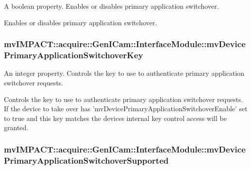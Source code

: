 A boolean property. Enables or disables primary application switchover. 

Enables or disables primary application switchover. \hypertarget{classmv_i_m_p_a_c_t_1_1acquire_1_1_gen_i_cam_1_1_interface_module_a3f91c3df402ffff61dcf0f896d2cc4cf}{
\subsubsection[{mv\+Device\+Primary\+Application\+Switchover\+Key}]{ mv\+I\+M\+P\+A\+C\+T\+::acquire\+::\+Gen\+I\+Cam\+::\+Interface\+Module\+::mv\+Device\+Primary\+Application\+Switchover\+Key}}\label{classmv_i_m_p_a_c_t_1_1acquire_1_1_gen_i_cam_1_1_interface_module_a3f91c3df402ffff61dcf0f896d2cc4cf}


An integer property. Controls the key to use to authenticate primary application switchover requests. 

Controls the key to use to authenticate primary application switchover requests. If the device to take over has 'mv\+Device\+Primary\+Application\+Switchover\+Enable' set to true and this key matches the devices internal key control access will be granted. \hypertarget{classmv_i_m_p_a_c_t_1_1acquire_1_1_gen_i_cam_1_1_interface_module_a3f9e99053d780484f731fa67521ceaf2}{
\subsubsection[{mv\+Device\+Primary\+Application\+Switchover\+Supported}]{ mv\+I\+M\+P\+A\+C\+T\+::acquire\+::\+Gen\+I\+Cam\+::\+Interface\+Module\+::mv\+Device\+Primary\+Application\+Switchover\+Supported}}\label{classmv_i_m_p_a_c_t_1_1acquire_1_1_gen_i_cam_1_1_interface_module_a3f9e99053d780484f731fa67521ceaf2}


